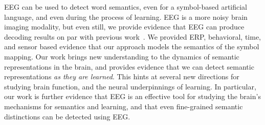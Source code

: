 \label{chapter:conclusion}

EEG can be used to detect word semantics, even for a symbol-based artificial 
language, and even during the process of learning.  EEG is a more noisy brain 
imaging modality, but even still, we provide evidence that EEG can produce 
decoding results on par with previous work~\cite{Mitchell2008}. We provided 
ERP, behavioral, time, and sensor based evidence that our approach models the 
semantics of the symbol mapping. Our work brings new understanding to the 
dynamics of semantic representations in the brain, and provides evidence that 
we can detect semantic representations \emph{as they are learned}.  This hints 
at several new directions for studying brain function, and the neural 
underpinnings of learning.  In particular, our work is further evidence that 
EEG is an effective tool for studying the brain's mechanisms for semantics and 
learning, and that even fine-grained semantic distinctions can be detected 
using EEG.
